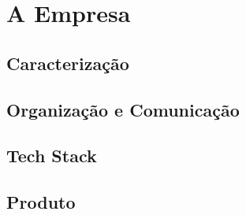 \chapter{A Empresa}
\label{cap2}

\section{Caracterização}

\lipsum

\section{Organização e Comunicação}

\lipsum

\section{Tech Stack}

\lipsum

\section{Produto}

\lipsum

